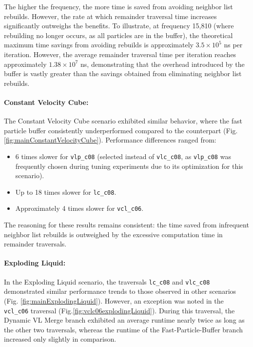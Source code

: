 The higher the frequency, the more time is saved from avoiding neighbor list rebuilds. However, the rate at which remainder traversal time increases significantly outweighs the benefits. To illustrate, at frequency 15,810 (where rebuilding no longer occurs, as all particles are in the buffer), the theoretical maximum time savings from avoiding rebuilds is approximately $3.5 \times 10^5$ ns per iteration. However, the average remainder traversal time per iteration reaches approximately $1.38 \times 10^7$ ns, demonstrating that the overhead introduced by the buffer is vastly greater than the savings obtained from eliminating neighbor list rebuilds.

\paragraph{Constant Velocity Cube:}

The Constant Velocity Cube scenario exhibited similar behavior, where the fast particle buffer consistently underperformed compared to the counterpart (Fig. \ref{fig:mainConstantVelocityCube}). Performance differences ranged from:
\begin{itemize}
    \item 6 times slower for \texttt{vlp\_c08} (selected instead of \texttt{vlc\_c08}, as \texttt{vlp\_c08} was frequently chosen during tuning experiments due to its optimization for this scenario).
    \item Up to 18 times slower for \texttt{lc\_c08}.
    \item Approximately 4 times slower for \texttt{vcl\_c06}.
\end{itemize}

The reasoning for these results remains consistent: the time saved from infrequent neighbor list rebuilds is outweighed by the excessive computation time in remainder traversals.

\paragraph{Exploding Liquid:} \label{para:exploding_liquid}
In the Exploding Liquid scenario, the traversals \texttt{lc\_c08} and \texttt{vlc\_c08} demonstrated similar performance trends to those observed in other scenarios (Fig. \ref{fig:mainExplodingLiquid}). However, an exception was noted in the \texttt{vcl\_c06} traversal (Fig.\ref{fig:vclc06explodingLiquid}). During this traversal, the Dynamic VL Merge branch exhibited an average runtime nearly twice as long as the other two traversals, whereas the runtime of the Fast-Particle-Buffer branch increased only slightly in comparison.

